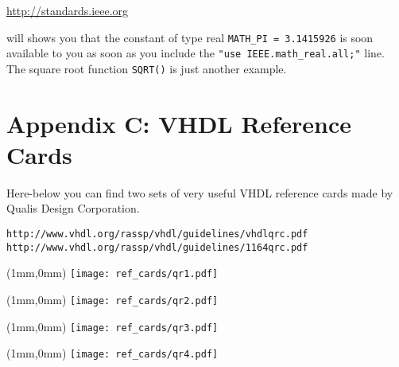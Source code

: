 \url{http://standards.ieee.org} 

will shows you that the constant of type real \texttt{MATH\_PI = 3.1415926} is soon available to you as soon as you include the \texttt{"use IEEE.math\_real.all;"} line. The square root function \texttt{SQRT()} is just another example.

\chapter{Appendix C: VHDL Reference Cards}
Here-below you can find two sets of very useful VHDL reference cards made by Qualis Design Corporation.

\begin{verbatim}
http://www.vhdl.org/rassp/vhdl/guidelines/vhdlqrc.pdf
http://www.vhdl.org/rassp/vhdl/guidelines/1164qrc.pdf
\end{verbatim}

\newpage\clearpage
\thispagestyle{empty}
\begin{textblock*}{174mm}(1mm,0mm)
\texttt{[image: ref\_cards/qr1.pdf]}
\end{textblock*}
\null\newpage

\thispagestyle{empty}
\begin{textblock*}{174mm}(1mm,0mm)
\texttt{[image: ref\_cards/qr2.pdf]}
\end{textblock*}
\null\newpage

\thispagestyle{empty}
\begin{textblock*}{174mm}(1mm,0mm)
\texttt{[image: ref\_cards/qr3.pdf]}
\end{textblock*}
\null\newpage

\thispagestyle{empty}
\begin{textblock*}{174mm}(1mm,0mm)
\texttt{[image: ref\_cards/qr4.pdf]}
\end{textblock*}
\null\newpage


